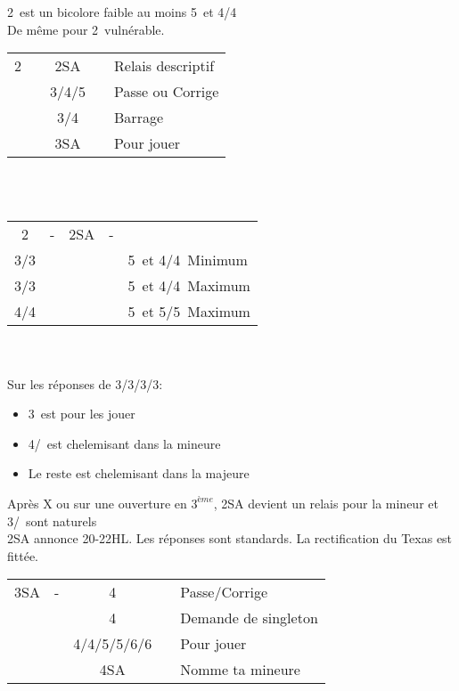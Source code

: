 \documentclass[a4paper, oneside, 11pt]{report}
\begin{document}
	2\pique\ est un bicolore faible au moins 5\pique\ et 4\trefle/4\carreau\\
	De même pour 2\coeur\ vulnérable.\\

	\begin{tabular}{cccc|l}
	2\pique && 2SA && Relais descriptif\\
	&& 3\trefle/4\trefle/5\trefle && Passe ou Corrige\\
	&& 3\pique/4\pique && Barrage\\
	&& 3SA && Pour jouer\\
	\end{tabular}\\\\

	\begin{tabular}{cccc|l}
	2\pique & - & 2SA & - &\\
	3\trefle/3\carreau &&&& 5\pique\ et 4\trefle/4\carreau\ Minimum\\
	3\coeur/3\pique &&&& 5\pique\ et 4\trefle/4\carreau\ Maximum\\
	4\trefle/4\carreau &&&& 5\pique\ et 5\trefle/5\carreau\ Maximum\\
	\end{tabular}\\\\
	
	Sur les réponses de 3\trefle/3\carreau/3\coeur/3\pique:
	\begin{itemize}
	\item 3\pique\ est pour les jouer
	\item 4\trefle/\carreau\ est chelemisant dans la mineure
	\item Le reste est chelemisant dans la majeure\\
	\end{itemize}
	
	Après X ou sur une ouverture en $3^{ème}$, 2SA devient un relais pour la mineur et 3\trefle/\carreau\ sont naturels\\

	2SA annonce 20-22HL. Les réponses sont standards. La rectification du Texas est fittée.\\

	\begin{tabular}{cccc|l}
	3SA & - & 4\trefle && Passe/Corrige\\
	&& 4\carreau && Demande de singleton\\
	&& 4\coeur/4\pique/5\trefle/5\carreau/6\trefle/6\carreau && Pour jouer\\
	&& 4SA && Nomme ta mineure\\
	\end{tabular}\\\\
	
\end{document}
